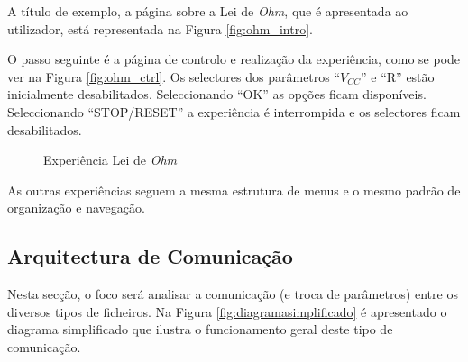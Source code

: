 A título de exemplo, a página sobre a Lei de \textit{Ohm}, que é apresentada ao utilizador, está representada na Figura \ref{fig:ohm_intro}.

O passo seguinte é a página de controlo e realização da experiência, como se pode ver na Figura \ref{fig:ohm_ctrl}. Os selectores dos parâmetros ``$V_{CC}$'' e ``R'' estão inicialmente desabilitados. Seleccionando ``OK'' as opções ficam disponíveis. Seleccionando ``STOP/RESET'' a experiência é interrompida e os selectores ficam desabilitados.

\begin{figure}[hbtp]
	\centering%
		\centering
		\qquad
		\caption{Experiência Lei de \textit{Ohm}}%
		\label{fig:pagohm}%
	\end{figure}

As outras experiências seguem a mesma estrutura de menus e o mesmo padrão de organização e navegação.

\subsection{Arquitectura de Comunicação}
\label{sec:comunicacao}
Nesta secção, o foco será analisar a comunicação (e troca de parâmetros) entre os diversos tipos de ficheiros. Na Figura \ref{fig:diagramasimplificado} é apresentado o diagrama simplificado que ilustra o funcionamento geral deste tipo de comunicação. 

